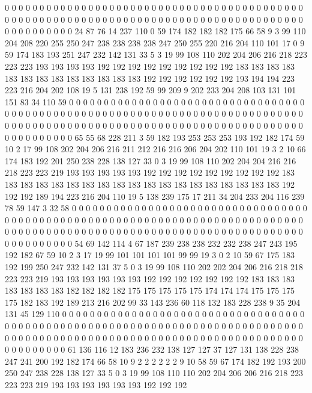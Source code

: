 0 0 0 0 0 0 0 0 0 0 0 0 0 0 0 0 0 0 0 0
0 0 0 0 0 0 0 0 0 0 0 0 0 0 0 0 0 0 0 0
0 0 0 0 0 0 0 0 0 0 0 0 0 0 0 0 0 0 0 0
0 0 0 0 0 0 0 0 0 0 0 0 0 0 0 0 0 0 0 0
0 0 0 0 0 0 0 0 0 0 0 0 0 0 0 0 24 87 76 14
237 110 0 59 174 182 182 182 175 66 58 9 3 99 110 204 208 220 255 250
247 238 238 238 238 247 250 255 220 216 204 110 101 17 0 9 59 174 183 193
251 247 232 142 131 33 5 3 19 99 108 110 202 204 206 216 218 223 223 223
193 193 193 193 192 192 192 192 192 192 192 192 192 183 183 183 183 183 183 183
183 183 183 183 183 183 192 192 192 192 192 192 193 194 194 223 223 216 204 202
108 19 5 131 238 192 59 99 209 9 202 233 204 208 103 131 101 151 83 34
110 59 0 0 0 0 0 0 0 0 0 0 0 0 0 0 0 0 0 0
0 0 0 0 0 0 0 0 0 0 0 0 0 0 0 0 0 0 0 0
0 0 0 0 0 0 0 0 0 0 0 0 0 0 0 0 0 0 0 0
0 0 0 0 0 0 0 0 0 0 0 0 0 0 0 0 0 0 0 0
0 0 0 0 0 0 0 0 0 0 0 0 0 0 0 0 0 0 0 0
0 0 0 0 0 0 0 0 0 0 0 0 0 0 0 0 0 0 0 0
0 0 0 0 0 0 0 0 0 0 0 0 65 55 68 228 211 3 59 182
193 253 253 253 193 192 182 174 59 10 2 17 99 108 202 204 206 216 211 212
216 216 206 204 202 110 101 19 3 2 10 66 174 183 192 201 250 238 228 138
127 33 0 3 19 99 108 110 202 204 204 216 216 218 223 223 219 193 193 193
193 193 192 192 192 192 192 192 192 192 192 183 183 183 183 183 183 183 183 183
183 183 183 183 183 183 183 183 183 183 192 192 192 189 194 223 216 204 110 19
5 138 239 175 17 211 34 204 233 204 116 239 78 59 147 3 32 58 0 0
0 0 0 0 0 0 0 0 0 0 0 0 0 0 0 0 0 0 0 0
0 0 0 0 0 0 0 0 0 0 0 0 0 0 0 0 0 0 0 0
0 0 0 0 0 0 0 0 0 0 0 0 0 0 0 0 0 0 0 0
0 0 0 0 0 0 0 0 0 0 0 0 0 0 0 0 0 0 0 0
0 0 0 0 0 0 0 0 0 0 0 0 0 0 0 0 0 0 0 0
0 0 0 0 0 0 0 0 0 0 0 0 0 0 0 0 0 0 0 0
0 0 0 0 0 0 0 0 54 69 142 114 4 67 187 239 238 238 232 232
238 247 243 195 192 182 67 59 10 2 3 17 19 99 101 101 101 101 99 99
19 3 0 2 10 59 67 175 183 192 199 250 247 232 142 131 37 5 0 3
19 99 108 110 202 202 204 206 216 218 218 223 223 219 193 193 193 193 193 193
192 192 192 192 192 192 192 183 183 183 183 183 183 183 182 182 182 182 175 175
175 175 175 174 174 174 175 175 175 175 182 183 192 189 213 216 202 99 33 143
236 60 118 132 183 228 238 9 35 204 131 45 129 110 0 0 0 0 0 0
0 0 0 0 0 0 0 0 0 0 0 0 0 0 0 0 0 0 0 0
0 0 0 0 0 0 0 0 0 0 0 0 0 0 0 0 0 0 0 0
0 0 0 0 0 0 0 0 0 0 0 0 0 0 0 0 0 0 0 0
0 0 0 0 0 0 0 0 0 0 0 0 0 0 0 0 0 0 0 0
0 0 0 0 0 0 0 0 0 0 0 0 0 0 0 0 0 0 0 0
0 0 0 0 0 0 0 0 0 0 0 0 0 0 0 0 0 0 0 0
0 0 0 0 61 136 116 12 183 236 232 138 127 127 37 127 131 138 228 238
247 241 200 192 182 174 66 58 10 9 2 2 2 2 2 2 9 10 58 59
67 174 182 192 193 200 250 247 238 228 138 127 33 5 0 3 19 99 108 110
110 202 204 206 206 216 218 223 223 223 219 193 193 193 193 193 193 192 192 192
